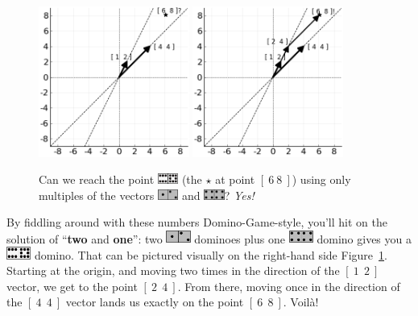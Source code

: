 \begin{figure}[ht]
\centering
\includegraphics[width=0.44\textwidth]{yellowVectors6_8.png}
\includegraphics[width=0.44\textwidth]{yellowVectors6_8sol.png}
\caption{Can we reach the point
\protect\includegraphics[width=0.06\textwidth]{white6_8.png} (the {\Large
$\star$} at
point $[\ 6\ 8\ ]$) using only multiples of the vectors
\protect\includegraphics[width=0.06\textwidth]{gray1_2.png} and
\protect\includegraphics[width=0.06\textwidth]{gray4_4.png}? \textit{Yes!}}
\label{fig:yellowVectors6_8}
\end{figure}

By fiddling around with these numbers Domino-Game-style, you'll hit on the
solution of ``\textbf{two} and \textbf{one}'': two
\includegraphics[width=0.06\textwidth]{gray1_2.png} dominoes plus one
\includegraphics[width=0.06\textwidth]{gray4_4.png} domino gives you a
\includegraphics[width=0.06\textwidth]{white6_8.png} domino. That can be
pictured visually on the right-hand side Figure~\ref{fig:yellowVectors6_8}.
Starting at the origin, and moving two times in the direction of the $[\ 1\ \
2\ ]$ vector, we get to the point $[\ 2\ \ 4\ ]$. From there, moving once in
the direction of the $[\ 4\ \ 4\ ]$ vector lands us exactly on the point $[\ 6\
\ 8\ ]$. Voil\`{a}!

